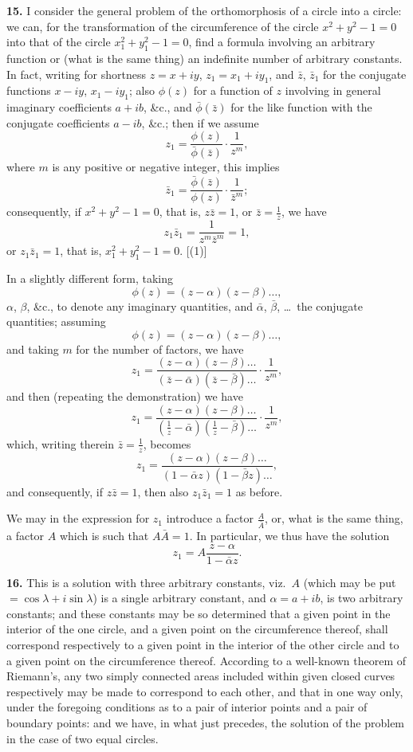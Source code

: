 \documentclass[11pt,a4paper]{book}
\begin{document}
\textbf{15.} I consider the general problem of the orthomorphosis of a circle into a
circle: we can, for the transformation of the circumference of the circle $x^2 + y^2 - 1 = 0$
into that of the circle $x_1^2 + y_1^2 - 1 = 0$, find a formula involving an arbitrary function
or (what is the same thing) an indefinite number of arbitrary constants. In fact,
writing for shortness $z = x + iy$, $z_1 = x_1 + iy_1$, and $\bar{z}$, $\bar{z}_1$ for the conjugate functions
$x - iy$, $x_1 - iy_1$; also $\phi(z)$ for a function of $z$ involving in general imaginary coefficients
$a + ib$, \&c., and $\bar{\phi}(\bar{z})$ for the like function with the conjugate coefficients
$a - ib$, \&c.; then if we assume
\[
z_1 = \frac{\phi(z)}{\bar{\phi}(\bar{z})} \cdot \frac{1}{z^m},
\]
where $m$ is any positive or negative integer, this implies
\[
\bar{z}_1 = \frac{\bar{\phi}(\bar{z})}{\phi(z)} \cdot \frac{1}{\bar{z}^m};
\]
consequently, if $x^2 + y^2 - 1 = 0$, that is, $z\bar{z} = 1$, or $\bar{z} = \frac{1}{z}$, we have
\[
z_1\bar{z}_1 = \frac{1}{z^m\bar{z}^m} = 1,
\]
or $z_1\bar{z}_1 = 1$, that is, $x_1^2 + y_1^2 - 1 = 0$. \hfill [(1)]

In a slightly different form, taking
\[
\phi(z) = (z - \alpha)(z - \beta)\ldots,
\]
$\alpha$, $\beta$, \&c., to denote any imaginary quantities,
and $\bar{\alpha}$, $\bar{\beta}$, \ldots\ the conjugate quantities; assuming
\[
\phi(z) = (z - \alpha)(z - \beta) \ldots,
\]
and taking $m$ for the number of factors, we have
\[
z_1 = \frac{(z - \alpha)(z - \beta)\ldots}{(\bar{z} - \bar{\alpha})(\bar{z} - \bar{\beta})\ldots} \cdot \frac{1}{z^m},
\]
and then (repeating the demonstration) we have
\[
z_1 = \frac{(z - \alpha)(z - \beta)\ldots}{(\frac{1}{z} - \bar{\alpha})(\frac{1}{z} - \bar{\beta})\ldots} \cdot \frac{1}{z^m},
\]
which, writing therein $\bar{z} = \frac{1}{z}$, becomes
\[
z_1 = \frac{(z - \alpha)(z - \beta)\ldots}{(1 - \bar{\alpha}z)(1 - \bar{\beta}z)\ldots},
\]
and consequently, if $z\bar{z} = 1$, then also $z_1\bar{z}_1 = 1$ as before.

We may in the expression for $z_1$ introduce a factor $\frac{A}{\bar{A}}$, or, what is the same
thing, a factor $A$ which is such that $A\bar{A} = 1$. In particular, we thus have the solution
\[
z_1 = A\frac{z - \alpha}{1 - \bar{\alpha}z}.
\]

\newpage
\textbf{16.} This is a solution with three arbitrary constants, viz.~$A$ (which may be
put $= \cos\lambda + i\sin\lambda$) is a single arbitrary constant, and $\alpha = a + ib$, is two arbitrary
constants; and these constants may be so determined that a given point in the
interior of the one circle, and a given point on the circumference thereof, shall
correspond respectively to a given point in the interior of the other circle and to a
given point on the circumference thereof. According to a well-known theorem of
Riemann's, any two simply connected areas included within given closed curves
respectively may be made to correspond to each other, and that in one way only,
under the foregoing conditions as to a pair of interior points and a pair of boundary
points: and we have, in what just precedes, the solution of the problem in the case
of two equal circles.
\end{document}
